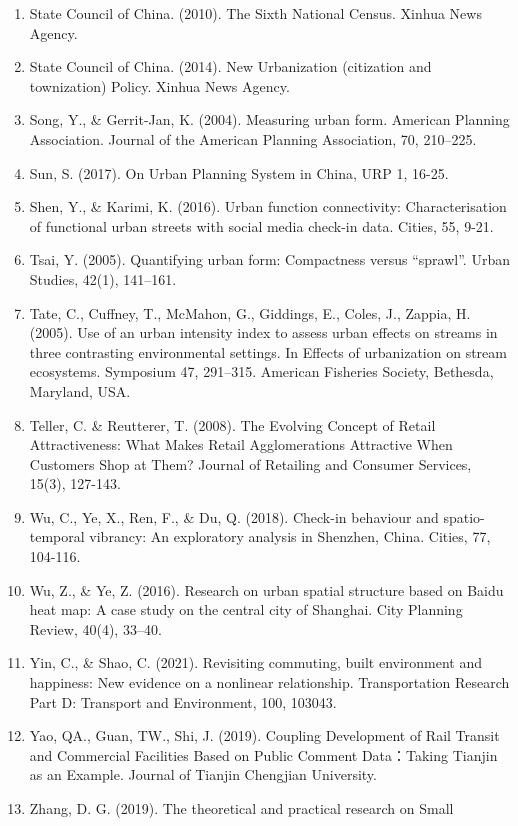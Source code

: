\documentclass[
]{article}
\begin{document}
\begin{enumerate}
\item
  State Council of China. (2010). The Sixth National Census. Xinhua News
  Agency.
\item
  State Council of China. (2014). New Urbanization (citization and
  townization) Policy. Xinhua News Agency.
\item
  Song, Y., \& Gerrit-Jan, K. (2004). Measuring urban form. American
  Planning Association. Journal of the American Planning Association,
  70, 210--225.
\item
  Sun, S. (2017). On Urban Planning System in China, URP 1, 16-25.
\item
  Shen, Y., \& Karimi, K. (2016). Urban function connectivity:
  Characterisation of functional urban streets with social media
  check-in data. Cities, 55, 9-21.
\item
  Tsai, Y. (2005). Quantifying urban form: Compactness versus
  ``sprawl''. Urban Studies, 42(1), 141--161.
\item
  Tate, C., Cuffney, T., McMahon, G., Giddings, E., Coles, J., Zappia,
  H. (2005). Use of an urban intensity index to assess urban effects on
  streams in three contrasting environmental settings. In Effects of
  urbanization on stream ecosystems. Symposium 47, 291--315. American
  Fisheries Society, Bethesda, Maryland, USA.
\item
  Teller, C. \& Reutterer, T. (2008). The Evolving Concept of Retail
  Attractiveness: What Makes Retail Agglomerations Attractive When
  Customers Shop at Them? Journal of Retailing and Consumer Services,
  15(3), 127-143.
\item
  Wu, C., Ye, X., Ren, F., \& Du, Q. (2018). Check-in behaviour and
  spatio-temporal vibrancy: An exploratory analysis in Shenzhen, China.
  Cities, 77, 104-116.
\item
  Wu, Z., \& Ye, Z. (2016). Research on urban spatial structure based on
  Baidu heat map: A case study on the central city of Shanghai. City
  Planning Review, 40(4), 33--40.
\item
  Yin, C., \& Shao, C. (2021). Revisiting commuting, built environment
  and happiness: New evidence on a nonlinear relationship.
  Transportation Research Part D: Transport and Environment, 100,
  103043.
\item
  Yao, QA., Guan, TW., Shi, J. (2019). Coupling Development of Rail
  Transit and Commercial Facilities Based on Public Comment Data：Taking
  Tianjin as an Example. Journal of Tianjin Chengjian University.
\item
  Zhang, D. G. (2019). The theoretical and practical research on Small

\end{enumerate}
\end{document}
